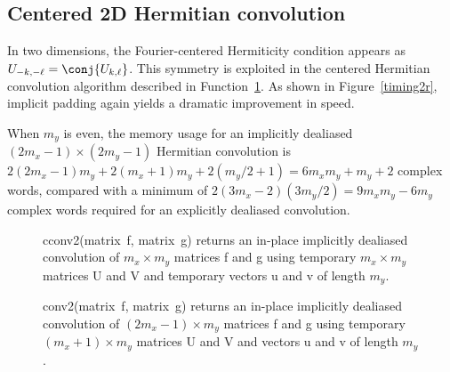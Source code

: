 \documentclass[final]{siamltex}
\begin{document}
\subsection{Centered 2D Hermitian convolution}

In two dimensions, the Fourier-centered Hermiticity condition appears as
$U_{-k,-\ell}=\conj{U_{k,\ell}}$. 
This symmetry is exploited in the centered Hermitian convolution
algorithm described in Function~\ref{conv2}. As shown in
Figure~\ref{timing2r}, implicit padding again yields a dramatic improvement
in speed.

When $m_y$ is even, the memory usage for an implicitly dealiased
$(2m_x-1)\times (2m_y-1)$ Hermitian convolution is
$2(2m_x-1)m_y+2(m_x+1)m_y+2(m_y/2+1)=6m_xm_y+m_y+2$ complex words, compared
with a minimum of $2(3m_x-2)(3m_y/2)=9m_xm_y-6m_y$ complex words required
for an explicitly dealiased convolution.

\begin{figure}[htbp]
\begin{minipage}{0.5\linewidth}
\begin{function}[H]
  \Return \xf\;
\caption{cconv2(matrix~{\sf f}, matrix~{\sf g}) 
returns an in-place implicitly dealiased convolution of
$m_x\times m_y$ matrices {\sf f} and {\sf g} using temporary $m_x\times m_y$
matrices {\sf U} and {\sf V} and temporary vectors {\sf u} and {\sf v} of
length $m_y$.}\label{cconv2}
\end{function}
\end{minipage}
%
\begin{minipage}{0.5\linewidth}
\begin{function}[H]
  \Return \xf\;
\caption{conv2(matrix~{\sf f}, matrix~{\sf g}) 
returns an in-place implicitly dealiased convolution of $(2m_x-1)\times
m_y$ matrices {\sf f} and {\sf g} using temporary $(m_x+1)\times m_y$ matrices 
{\sf U} and {\sf V} and vectors {\sf u} and {\sf v} of length $m_y$.
}\label{conv2}
\end{function}
\end{minipage}
\end{figure}
\end{document}
